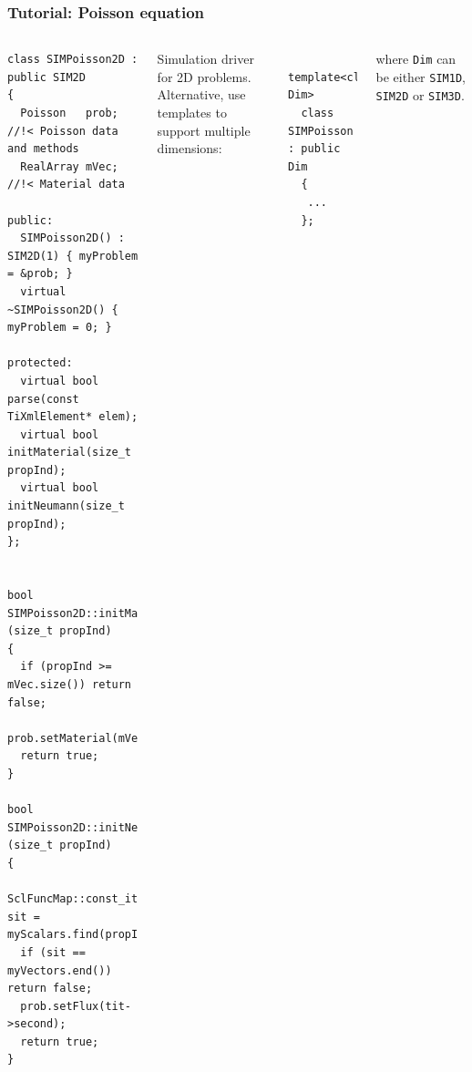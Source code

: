 \documentclass{beamer}
\begin{document}
\begin{frame}[fragile] %
 \frametitle{Tutorial: Poisson equation}

 \begin{columns}[c]
  \tiny\begin{verbatim}
class SIMPoisson2D : public SIM2D
{
  Poisson   prob; //!< Poisson data and methods
  RealArray mVec; //!< Material data

public:
  SIMPoisson2D() : SIM2D(1) { myProblem = &prob; }
  virtual ~SIMPoisson2D() { myProblem = 0; }

protected:
  virtual bool parse(const TiXmlElement* elem);
  virtual bool initMaterial(size_t propInd);
  virtual bool initNeumann(size_t propInd);
};


bool SIMPoisson2D::initMaterial (size_t propInd)
{
  if (propInd >= mVec.size()) return false;
  prob.setMaterial(mVec[propInd]);
  return true;
}

bool SIMPoisson2D::initNeumann (size_t propInd)
{
  SclFuncMap::const_iterator sit = myScalars.find(propInd);
  if (sit == myVectors.end()) return false;
  prob.setFlux(tit->second);
  return true;
}
  \end{verbatim}
  \small
  Simulation driver for 2D problems.\\[5mm]

  \pause
  Alternative, use templates to support multiple dimensions:
  \tiny\begin{verbatim}
  template<class Dim>
  class SIMPoisson : public Dim
  {
   ...
  };
  \end{verbatim}
  \small where {\tt Dim} can be either {\tt SIM1D}, {\tt SIM2D} or {\tt SIM3D}.
 \end{columns}
\end{frame}
\end{document}
